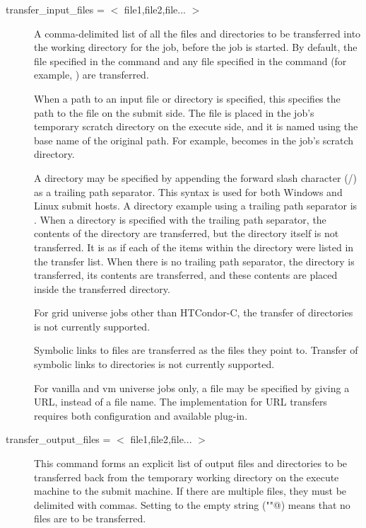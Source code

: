 \begin{description}

\item[transfer\_input\_files = $<$ file1,file2,file... $>$]
\label{man-condor-submit-transfer-input-files}
A comma-delimited list of all the files and directories to be transferred
into the working directory for the job, before the job is started.
By default, the file specified in the
 command and any file specified in the 
command (for example, ) are transferred.

When a path to an input file or directory is specified, this specifies
the path to the file on the submit side.
The file is placed in the job's temporary scratch directory on the execute side,
and it is named using the base name of the original path.  For
example,  becomes  in the job's
scratch directory.

A directory may be specified by appending the forward slash character (/)
as a trailing path separator.
This syntax is used for both Windows and Linux submit hosts.
A directory example using a trailing path separator
is . 
When a directory is specified with the trailing path separator,
the contents of the directory are
transferred,  but the directory itself is not transferred.
It is as if each of the items
within the directory were listed in the transfer list.
When there is no trailing path separator,
the directory is transferred, its contents are transferred,
and these contents are placed inside the transferred directory.

For grid universe jobs other than HTCondor-C, the transfer of
directories is not currently supported.

Symbolic links to files are transferred as the files they point to.
Transfer of symbolic links to directories is not currently supported.

For vanilla and vm universe jobs only,
a file may be specified by giving a URL, instead of a file name.
The implementation for URL transfers requires both configuration
and available plug-in. 
 

\label{man-condor-submit-transfer-output-files}
\item[transfer\_output\_files = $<$ file1,file2,file... $>$]
This command forms an explicit list of output files and directories 
to be transferred
back from the temporary working directory on the execute machine to
the submit machine.
If there are multiple files, they must be delimited with commas.
Setting  to the empty string (\verb@""@)
means that no files are to be transferred.


\end{description}
